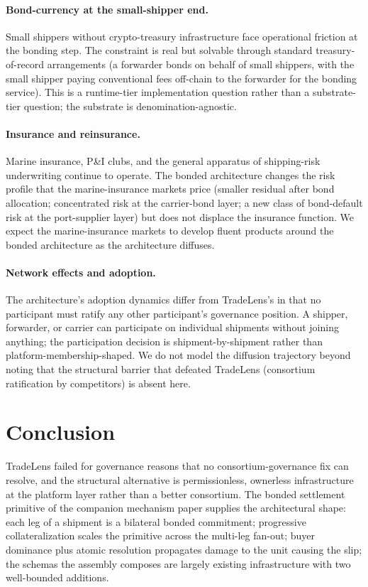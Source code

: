\documentclass[11pt,a4paper]{article}
\theoremstyle{definition}
\theoremstyle{remark}
\begin{document}
\paragraph{Bond-currency at the small-shipper end.}
Small shippers without crypto-treasury infrastructure face
operational friction at the bonding step. The constraint is
real but solvable through standard treasury-of-record
arrangements (a forwarder bonds on behalf of small shippers,
with the small shipper paying conventional fees off-chain to the
forwarder for the bonding service). This is a runtime-tier
implementation question rather than a substrate-tier question;
the substrate is denomination-agnostic.

\paragraph{Insurance and reinsurance.}
Marine insurance, P\&I clubs, and the general apparatus of
shipping-risk underwriting continue to operate. The bonded
architecture changes the risk profile that the marine-insurance
markets price (smaller residual after bond allocation;
concentrated risk at the carrier-bond layer; a new class of
bond-default risk at the port-supplier layer) but does not
displace the insurance function. We expect the marine-insurance
markets to develop fluent products around the bonded
architecture as the architecture diffuses.

\paragraph{Network effects and adoption.}
The architecture's adoption dynamics differ from TradeLens's in
that no participant must ratify any other participant's
governance position. A shipper, forwarder, or carrier can
participate on individual shipments without joining anything;
the participation decision is shipment-by-shipment rather than
platform-membership-shaped. We do not model the diffusion
trajectory beyond noting that the structural barrier that
defeated TradeLens (consortium ratification by competitors) is
absent here.

\section{Conclusion}
\label{sec:conclusion}

TradeLens failed for governance reasons that no
consortium-governance fix can resolve, and the structural
alternative is permissionless, ownerless infrastructure at the
platform layer rather than a better consortium. The bonded
settlement primitive of the companion mechanism paper supplies
the architectural shape: each leg of a shipment is a bilateral
bonded commitment; progressive collateralization scales the
primitive across the multi-leg fan-out; buyer dominance plus
atomic resolution propagates damage to the unit causing the
slip; the schemas the assembly composes are largely existing
infrastructure with two well-bounded additions.
\end{document}
